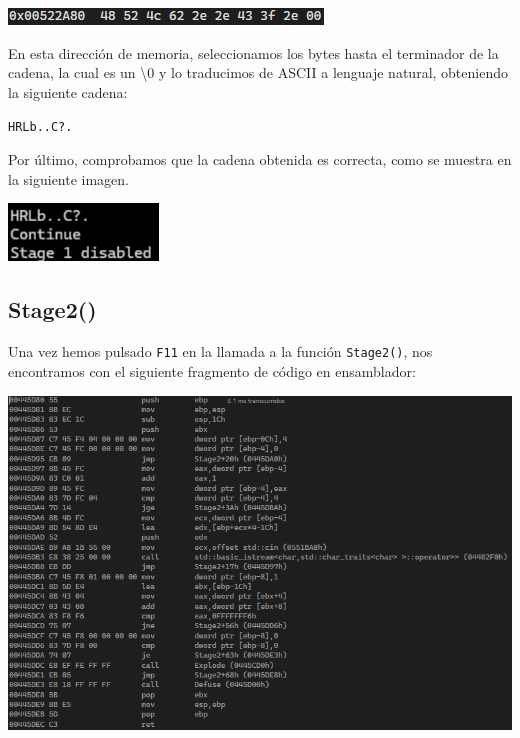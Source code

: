 \documentclass[11pt,a4paper]{article}
\begin{document}
\begin{center}
  \includegraphics[width=\textwidth]{Stage1/cadenaStage1.png}
\end{center}

En esta dirección de memoria, seleccionamos los bytes hasta el terminador de la cadena, la cual 
es un \textbackslash{}\(0\) y lo traducimos de ASCII a lenguaje natural, 
obteniendo la siguiente cadena:
\begin{center}
\texttt{HRLb..C?.}
\end{center}

Por último, comprobamos que la cadena obtenida es correcta, como se muestra en la siguiente imagen.
\begin{center}
  \includegraphics[width=0.3\textwidth]{Stage1/Stage1Correcto.png}
\end{center}

\newpage

\subsection{Stage2()}
Una vez hemos pulsado \texttt{F11} en la llamada a la función \texttt{Stage2()}, nos encontramos con el siguiente fragmento de código 
en ensamblador:
\begin{center}
\includegraphics[width=\textwidth]{Stage 2/codigoStage2.png}
\end{center}
\end{document}
